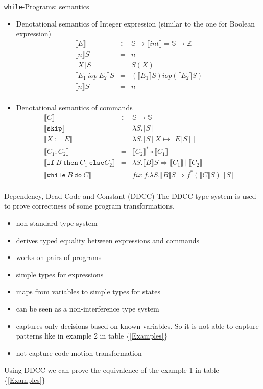 \documentclass[11pt]{beamer}
\newcommand{\Z}{\mathbb{Z}}
\newcommand{\St}{\mathbb{S}}
\newcommand{\bbracket}[1]{\llbracket #1 \rrbracket}
\newcommand{\cceil}[1]{\lceil #1 \rceil}
\newcommand{\while}[2]{\mathtt{while}~#1~\mathtt{do}~#2}
\newcommand{\ifc}[3]{\mathtt{if}~#1~\mathtt{then}~#2~\mathtt{else}#3}
\begin{document}
\begin{frame}{\texttt{while}-Programs: semantics}
\begin{itemize}
\item Denotational semantics of Integer expression (similar to the one for Boolean expression)
$$
\begin{array}{rcl}
\bbracket{E} &\in& \St \rightarrow \bbracket{int}=\St \rightarrow \Z\\
\bbracket{n}S &=& n\\
\bbracket{X}S &=& S(X)\\
\bbracket{E_1~iop~E_2}S &=& (\bbracket{E_1}S)iop(\bbracket{E_2}S)\\
\bbracket{n}S &=& n\\
\end{array}
$$
\item Denotational semantics of commands 
$$
\begin{array}{rcl}
\bbracket{C}&\in& \St \rightarrow \St_\perp\\
\bbracket{\texttt{skip}} &=& \lambda S.\cceil{S}\\
\bbracket{X:=E} &=& \lambda S.\cceil{S[X \mapsto \bbracket{E}S]}\\
\bbracket{C_1;C_2} &=& \bbracket{C_2}^*\circ\bbracket{C_1}\\
\bbracket{\ifc{B}{C_1}{C_2}} &=& \lambda S.\bbracket{B}S \Rightarrow \bbracket{C_1}~|~\bbracket{C_2}\\
\bbracket{\while{B}{C}} &=& fix~f.\lambda S.\bbracket{B}S \Rightarrow f^*(\bbracket{C}S)|\cceil{S}\\
\end{array}
$$
\end{itemize}
\end{frame}

\begin{frame}{Dependency, Dead Code and Constant (DDCC)}
The DDCC type system is used to prove correctness of some program transformations.
\begin{itemize}
\item non-standard type system
\item derives typed equality between expressions and commands
\item works on pairs of programs
\item simple types for expressions
\item maps from variables to simple types for states
\item can be seen as a non-interference type system 
\item captures only decisions based on known variables. So it is not able to capture patterns like in example 2 in table \{\ref{Examples}\}
\item not capture code-motion transformation
\end{itemize}
Using DDCC we can prove the equivalence of the example 1 in table \{\ref{Examples}\}
\end{frame}
\end{document}
